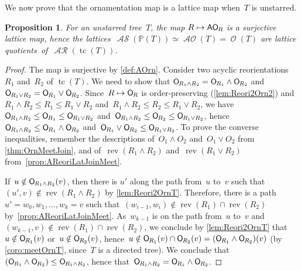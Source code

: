 \documentclass{amsart}
\newtheorem{proposition}[theorem]{Proposition}
\theoremstyle{definition}
\renewcommand{\c}[1]{\mathcal{#1}} %
\DeclareMathOperator{\tc}{tc} %
\newcommand{\meet}{\wedge} %
\newcommand{\join}{\vee} %
\newcommand{\mymap}[2]{\mathsf{#1}_{\hspace{-.7pt}#2}}
\DeclareMathOperator{\Orn}{\c{O}}  %
\newcommand{\orn}[1]{\mymap{O}{#1}}  %
\DeclareMathOperator{\AOrn}{\c{AO}}  %
\newcommand{\aorn}[1]{\mymap{AO}{#1}}  %
\DeclareMathOperator{\AReori}{\c{AR}}  %
\DeclareMathOperator{\rev}{rev} %
\DeclareMathOperator{\ASour}{\mathcal{AS}}  %
\newcommand{\PP}{\mathbb P} %
\begin{document}
We now prove that the ornamentation map is a lattice map when~$T$ is unstarred.

\begin{proposition}
\label{prop:AReori2AOrnLatticeMapUT}
For an unstarred tree~$T$, the map $R \mapsto \aorn{R}$ is a surjective lattice map, hence the lattices~$\ASour(\PP(T)) \simeq \AOrn(T) = \Orn(T)$ are lattice quotients~of~$\AReori(\tc(T))$.
\end{proposition}

\begin{proof}
The map is surjective by \cref{def:AOrn}.
Consider two acyclic reorientations~$R_1$ and~$R_2$ of $\tc(T)$.
We need to show that ${\orn{R_1 \meet R_2} = \orn{R_1} \meet \orn{R_2}}$ and~$\orn{R_1 \join R_2} = \orn{R_1} \join \orn{R_2}$.
Since~$R \mapsto \orn{R}$ is order-preserving (\cref{lem:Reori2Orn2}) and~$R_1 \meet R_2 \le R_1 \le R_1 \join R_2$ and~$R_1 \meet R_2 \le R_2 \le R_1 \join R_2$, we have~$\orn{R_1 \meet R_2} \le \orn{R_1} \le \orn{R_1 \join R_2}$ and~$\orn{R_1 \meet R_2} \le \orn{R_2} \le \orn{R_1 \join R_2}$, hence~${\orn{R_1 \meet R_2} \le \orn{R_1} \meet \orn{R_2}}$ and~${\orn{R_1} \join \orn{R_2} \le \orn{R_1 \join R_2}}$.
To prove the converse inequalities, remember the descriptions of~${O_1 \meet O_2}$ and~${O_1 \join O_2}$ from \cref{thm:OrnMeetJoin}, and of~$\rev(R_1 \meet R_2)$ and~$\rev(R_1 \join R_2)$ from~\cref{prop:AReoriLatJoinMeet}.

If~$u \notin \orn{R_1 \meet R_2}(v)$, then there is $u'$ along the path from~$u$ to~$v$ such that~$(u',v) \notin \rev(R_1 \meet R_2)$ by \cref{lem:Reori2OrnT}.
Therefore, there is a path~$u' = w_0, w_1, \dots, w_k = v$ such that~$(w_{i-1}, w_i) \notin \rev(R_1) \cap \rev(R_2)$ by~\cref{prop:AReoriLatJoinMeet}.
As~$w_{k-1}$ is on the path from~$u$ to~$v$ and~$(w_{k-1},v) \notin \rev(R_1) \cap \rev(R_2)$, we conclude by \cref{lem:Reori2OrnT} that~$u \notin \orn{R_1}(v)$ or~$u \notin \orn{R_2}(v)$, hence~$u \notin \orn{R_1}(v) \cap \orn{R_2}(v) = (\orn{R_1} \meet \orn{R_2})(v)$ (by \cref{coro:meetOrnT}, since~$T$ is a directed tree).
We conclude that~$(\orn{R_1} \meet \orn{R_2}) \le \orn{R_1 \meet R_2}$, hence that~$\orn{R_1 \meet R_2} = \orn{R_1} \meet \orn{R_2}$.


\end{proof}
\end{document}
